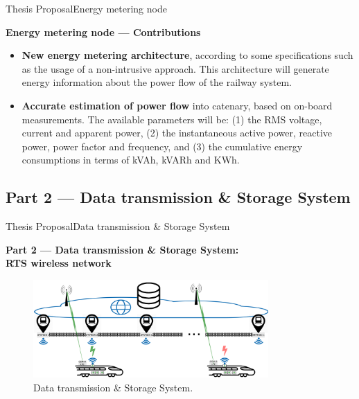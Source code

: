 \begin{frame}{Thesis Proposal}{Energy metering node}
\begin{block}{\textbf{Energy metering node --- Contributions}}
		\begin{itemize}
			\item \textbf{New energy metering architecture}, according to some specifications such as the usage of a non-intrusive approach.
			This architecture will generate energy information about the power flow of the railway system.
\pause			
			\item \textbf{Accurate estimation of power flow} into catenary, based on on-board measurements. The available parameters will be: (1) the RMS voltage, current and apparent power, (2) the instantaneous active power, reactive power, power factor and frequency, and (3) the cumulative energy consumptions in terms of kVAh, kVARh and KWh.
		\end{itemize}
\end{block}
\end{frame}


\subsection{Part 2 --- Data transmission \& Storage System}


\begin{frame}{Thesis Proposal}{Data transmission \& Storage System}
\begin{block}{\textbf{Part 2 --- Data transmission \& Storage System: \\ \small{RTS wireless network}}}
\begin{figure}[ht!]
	\centering
	\includegraphics[width=0.8\textwidth,keepaspectratio]{figures/40.Method/arch2}
	\caption{Data transmission \& Storage System.}
\end{figure}
\end{block}
\end{frame}

